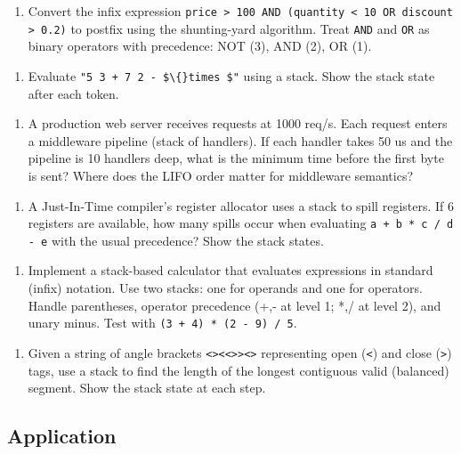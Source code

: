 \begin{enumerate}
\item Convert the infix expression \texttt{price > 100 AND (quantity < 10 OR discount > 0.2)} to postfix using the shunting-yard algorithm. Treat \texttt{AND} and \texttt{OR} as binary operators with precedence: NOT (3), AND (2), OR (1).
\end{enumerate}

\begin{enumerate}
\item Evaluate \texttt{"5 3 + 7 2 - \$\textbackslash\{\}times \$"} using a stack. Show the stack state after each token.
\end{enumerate}

\begin{enumerate}
\item A production web server receives requests at 1000 req/s. Each request enters a middleware pipeline (stack of handlers). If each handler takes 50 us and the pipeline is 10 handlers deep, what is the minimum time before the first byte is sent? Where does the LIFO order matter for middleware semantics?
\end{enumerate}

\begin{enumerate}
\item A Just-In-Time compiler's register allocator uses a stack to spill registers. If 6 registers are available, how many spills occur when evaluating \texttt{a + b * c / d - e} with the usual precedence? Show the stack states.
\end{enumerate}

\begin{enumerate}
\item Implement a stack-based calculator that evaluates expressions in standard (infix) notation. Use two stacks: one for operands and one for operators. Handle parentheses, operator precedence (+,- at level 1; *,/ at level 2), and unary minus. Test with \texttt{(3 + 4) * (2 - 9) / 5}.
\end{enumerate}

\begin{enumerate}
\item Given a string of angle brackets \texttt{<><<>><>} representing open (\texttt{<}) and close (\texttt{>}) tags, use a stack to find the length of the longest contiguous valid (balanced) segment. Show the stack state at each step.
\end{enumerate}

\subsection{Application}

